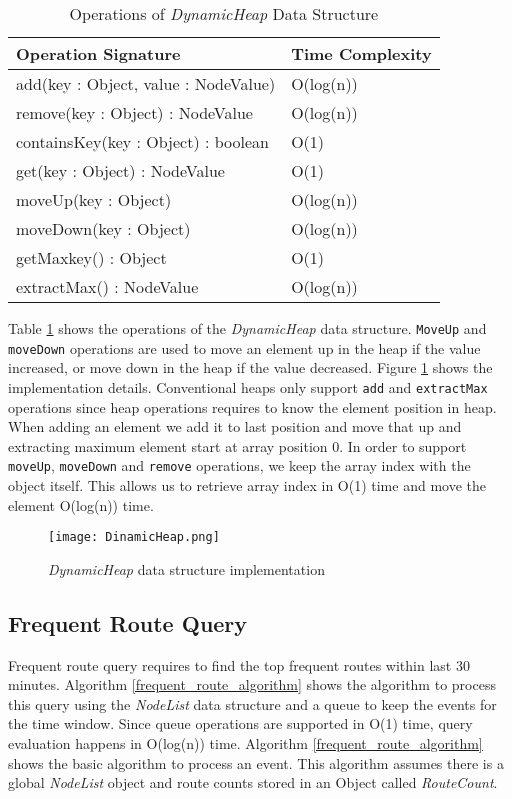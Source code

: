 \begin{table}
\centering
\caption{Operations of \textit{DynamicHeap} Data Structure}
\begin{tabular}{|l|l|} \hline
Operation Signature & Time Complexity \\ \hline \hline
add(key : Object, value : NodeValue) & O(log(n)) \\ \hline
remove(key : Object) : NodeValue & O(log(n)) \\ \hline
containsKey(key : Object) : boolean & O(1) \\ \hline
get(key : Object) : NodeValue & O(1) \\ \hline
moveUp(key : Object) & O(log(n)) \\ \hline
moveDown(key : Object) & O(log(n)) \\ \hline
getMaxkey() : Object & O(1) \\ \hline
extractMax() : NodeValue & O(log(n)) \\ \hline
\end{tabular}
\label{dynamicheap_api}
\end{table}

Table \ref{dynamicheap_api} shows the operations of the \textit{DynamicHeap} data structure. \texttt{MoveUp} and \texttt{moveDown} operations are used to move an element up in the heap if the value increased, or move down in the heap if the value decreased. Figure \ref{dynamicheap_impl} shows the implementation details. Conventional heaps only support \texttt{add} and \texttt{extractMax} operations since heap operations requires to know the element position in heap. When adding an element we add it to last position and move that up and extracting maximum element start at array position 0. In order to support \texttt{moveUp}, \texttt{moveDown} and \texttt{remove} operations, we keep the array index with the object itself. This allows us to retrieve array index in O(1) time and move the element O(log(n)) time.


\begin{figure}[!t]
        \centering
        \texttt{[image: DinamicHeap.png]}
        \caption{\textit{DynamicHeap} data structure implementation}
        \label{dynamicheap_impl}
\end{figure}

\subsection{Frequent Route Query}

Frequent route query requires to find the top frequent routes within last 30 minutes. Algorithm \ref{frequent_route_algorithm} shows the algorithm to process this query using the \textit{NodeList} data structure and a queue to keep the events for the time window.  Since queue operations are supported in O(1) time, query evaluation happens in O(log(n)) time. Algorithm \ref{frequent_route_algorithm} shows the basic algorithm to process an event. This algorithm assumes there is a global \textit{NodeList} object and route counts stored in an Object called \textit{RouteCount}. 

